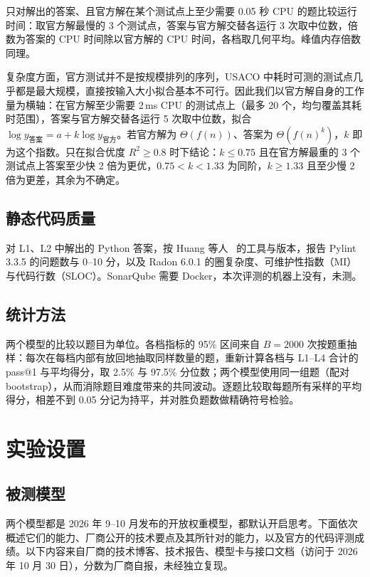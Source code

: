 \documentclass[11pt,a4paper,fontset=none]{ctexart}
\begin{document}
只对解出的答案、且官方解在某个测试点上至少需要 0.05 秒 CPU 的题比较运行时间：取官方解最慢的 3 个测试点，答案与官方解交替各运行 3 次取中位数，倍数为答案的 CPU 时间除以官方解的 CPU 时间，各档取几何平均。峰值内存倍数同理。

复杂度方面，官方测试并不是按规模排列的序列，USACO 中耗时可测的测试点几乎都是最大规模，直接按输入大小拟合基本不可行。因此我们以官方解自身的工作量为横轴：在官方解至少需要 2\,ms CPU 的测试点上（最多 20 个，均匀覆盖其耗时范围），答案与官方解交替各运行 5 次取中位数，拟合 $\log y_{\text{答案}} = a + k \log y_{\text{官方}}$。若官方解为 $\Theta(f(n))$、答案为 $\Theta(f(n)^k)$，$k$ 即为这个指数。只在拟合优度 $R^2 \ge 0.8$ 时下结论：$k \le 0.75$ 且在官方解最重的 3 个测试点上答案至少快 2 倍为更优，$0.75 < k < 1.33$ 为同阶，$k \ge 1.33$ 且至少慢 2 倍为更差，其余为不确定。

\subsection{静态代码质量}

对 L1、L2 中解出的 Python 答案，按 Huang 等人~\cite{quality} 的工具与版本，报告 Pylint 3.3.5 的问题数与 0--10 分，以及 Radon 6.0.1 的圈复杂度、可维护性指数（MI）与代码行数（SLOC）。SonarQube 需要 Docker，本次评测的机器上没有，未测。

\subsection{统计方法}

两个模型的比较以题目为单位。各档指标的 95\% 区间来自 $B = 2000$ 次按题重抽样：每次在每档内部有放回地抽取同样数量的题，重新计算各档与 L1--L4 合计的 pass@1 与平均得分，取 2.5\% 与 97.5\% 分位数；两个模型使用同一组题（配对 bootstrap），从而消除题目难度带来的共同波动。逐题比较取每题所有采样的平均得分，相差不到 0.05 分记为持平，并对胜负题数做精确符号检验。

\section{实验设置}
\label{sec:setup}

\subsection{被测模型}
\label{sec:models}

两个模型都是 2026 年 9--10 月发布的开放权重模型，都默认开启思考。下面依次概述它们的能力、厂商公开的技术要点及其所针对的能力，以及官方的代码评测成绩。以下内容来自厂商的技术博客、技术报告、模型卡与接口文档（访问于 2026 年 10 月 30 日），分数为厂商自报，未经独立复现。
\end{document}
